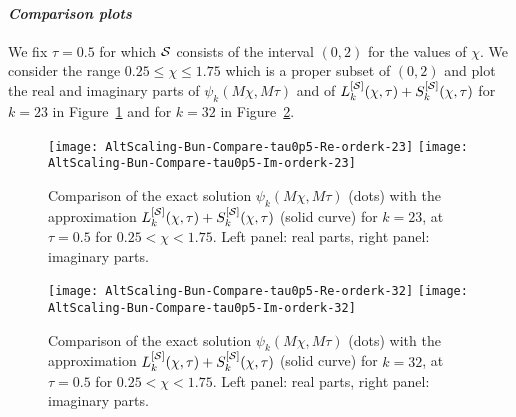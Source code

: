 \paragraph{\textit{Comparison plots}} We fix $\tau = 0.5$ for which $\mathcal{S}$ consists of the interval $(0,2)$ for the values of $\chi$. We consider the range $0.25\leq\chi\leq1.75$ which is a proper subset of $(0,2)$ and plot the real and imaginary parts of $\psi_k(M\chi, M\tau)$ and of
$ L_k^{[\mathcal{S}]}(\chi,\tau) + S_k^{[\mathcal{S}]}(\chi,\tau)$ for $k=23$ in Figure~\ref{f:comparison-bun-k-23} and for $k=32$ in Figure~\ref{f:comparison-bun-k-32}.
\begin{figure}[h]
\texttt{[image: AltScaling-Bun-Compare-tau0p5-Re-orderk-23]}\qquad
\texttt{[image: AltScaling-Bun-Compare-tau0p5-Im-orderk-23]}
\caption{Comparison of the exact solution $\psi_k(M \chi, M\tau)$ (dots) with the approximation $L_k^{[\mathcal{S}]}(\chi,\tau)+S_k^{[\mathcal{S}]}(\chi,\tau)$ (solid curve) for $k=23$, at $\tau=0.5$ for $0.25< \chi < 1.75$. Left panel: real parts, right panel: imaginary parts.}
\label{f:comparison-bun-k-23}
\end{figure}
\begin{figure}[h]
\texttt{[image: AltScaling-Bun-Compare-tau0p5-Re-orderk-32]}\qquad
\texttt{[image: AltScaling-Bun-Compare-tau0p5-Im-orderk-32]}
\caption{Comparison of the exact solution $\psi_k(M \chi, M\tau)$ (dots) with the approximation $L_k^{[\mathcal{S}]}(\chi,\tau)+S_k^{[\mathcal{S}]}(\chi,\tau)$ (solid curve) for $k=32$, at $\tau=0.5$ for $0.25< \chi < 1.75$. Left panel: real parts, right panel: imaginary parts.}
\label{f:comparison-bun-k-32}
\end{figure}

